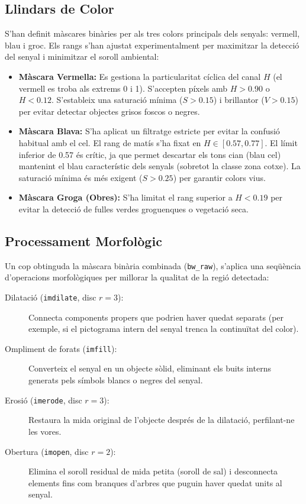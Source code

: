 \documentclass[a4paper,12pt]{article}
\begin{document}
\subsection{Llindars de Color}

S'han definit màscares binàries per als tres colors principals dels senyals: vermell, blau i groc. Els rangs s'han ajustat experimentalment per maximitzar la detecció del senyal i minimitzar el soroll ambiental:

\begin{itemize}
    \item \textbf{Màscara Vermella:} Es gestiona la particularitat cíclica del canal $H$ (el vermell es troba als extrems 0 i 1). S'accepten píxels amb $H > 0.90$ o $H < 0.12$. S'estableix una saturació mínima ($S > 0.15$) i brillantor ($V > 0.15$) per evitar detectar objectes grisos foscos o negres.
    
    \item \textbf{Màscara Blava:} S'ha aplicat un filtratge estricte per evitar la confusió habitual amb el cel. El rang de matís s'ha fixat en $H \in [0.57, 0.77]$. El límit inferior de 0.57 és crític, ja que permet descartar els tons cian (blau cel) mantenint el blau característic dels senyals (sobretot la classe zona cotxe). La saturació mínima és més exigent ($S > 0.25$) per garantir colors vius.
    
    \item \textbf{Màscara Groga (Obres):} S'ha limitat el rang superior a $H < 0.19$ per evitar la detecció de fulles verdes groguenques o vegetació seca.
\end{itemize}

\subsection{Processament Morfològic}

Un cop obtinguda la màscara binària combinada (\texttt{bw\_raw}), s'aplica una seqüència d'operacions morfològiques per millorar la qualitat de la regió detectada:

\begin{description}
    \item[Dilatació (\texttt{imdilate}, disc $r=3$):] Connecta components propers que podrien haver quedat separats (per exemple, si el pictograma intern del senyal trenca la continuïtat del color).
    \item[Ompliment de forats (\texttt{imfill}):] Converteix el senyal en un objecte sòlid, eliminant els buits interns generats pels símbols blancs o negres del senyal.
    \item[Erosió (\texttt{imerode}, disc $r=3$):] Restaura la mida original de l'objecte després de la dilatació, perfilant-ne les vores.
    \item[Obertura (\texttt{imopen}, disc $r=2$):] Elimina el soroll residual de mida petita (soroll de sal) i desconnecta elements fins com branques d'arbres que puguin haver quedat units al senyal.
\end{description}
\end{document}
